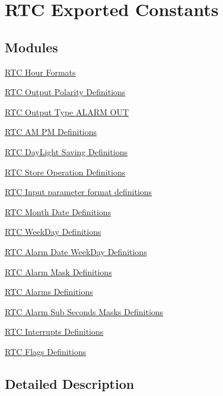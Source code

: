 \hypertarget{group___r_t_c___exported___constants}{}\section{R\+TC Exported Constants}
\label{group___r_t_c___exported___constants}
\subsection*{Modules}
\begin{DoxyCompactItemize}
\item 
\hyperlink{group___r_t_c___hour___formats}{R\+T\+C Hour Formats}
\item 
\hyperlink{group___r_t_c___output___polarity___definitions}{R\+T\+C Output Polarity Definitions}
\item 
\hyperlink{group___r_t_c___output___type___a_l_a_r_m___o_u_t}{R\+T\+C Output Type A\+L\+A\+R\+M O\+UT}
\item 
\hyperlink{group___r_t_c___a_m___p_m___definitions}{R\+T\+C A\+M P\+M Definitions}
\item 
\hyperlink{group___r_t_c___day_light_saving___definitions}{R\+T\+C Day\+Light Saving Definitions}
\item 
\hyperlink{group___r_t_c___store_operation___definitions}{R\+T\+C Store Operation Definitions}
\item 
\hyperlink{group___r_t_c___input__parameter__format__definitions}{R\+T\+C Input parameter format definitions}
\item 
\hyperlink{group___r_t_c___month___date___definitions}{R\+T\+C Month Date Definitions}
\item 
\hyperlink{group___r_t_c___week_day___definitions}{R\+T\+C Week\+Day Definitions}
\item 
\hyperlink{group___r_t_c___alarm_date_week_day___definitions}{R\+T\+C Alarm Date Week\+Day Definitions}
\item 
\hyperlink{group___r_t_c___alarm_mask___definitions}{R\+T\+C Alarm Mask Definitions}
\item 
\hyperlink{group___r_t_c___alarms___definitions}{R\+T\+C Alarms Definitions}
\item 
\hyperlink{group___r_t_c___alarm___sub___seconds___masks___definitions}{R\+T\+C Alarm Sub Seconds Masks Definitions}
\item 
\hyperlink{group___r_t_c___interrupts___definitions}{R\+T\+C Interrupts Definitions}
\item 
\hyperlink{group___r_t_c___flags___definitions}{R\+T\+C Flags Definitions}
\end{DoxyCompactItemize}


\subsection{Detailed Description}
